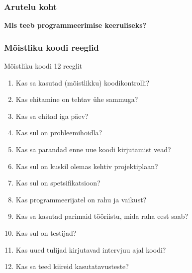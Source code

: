\begin{frame}[fragile]
  \frametitle{Arutelu koht}
		\begin{center}
			\textbf{Mis teeb programmeerimise keeruliseks?}
		\end{center}
\end{frame}


\begin{frame}[fragile]
  \frametitle{Mõistliku koodi reeglid}
  Mõistliku koodi 12 reeglit \cite{spolsky2004joel}
\small  
	\begin{enumerate}
		\item Kas sa kasutad (mõistlikku) koodikontrolli?
		\item Kas ehitamine on tehtav ühe sammuga?
		\item Kas sa ehitad iga päev?
		\item Kas sul on probleemihoidla?
		\item Kas sa parandad enne uue koodi kirjutamist vead?
		\item Kas sul on kuskil olemas kehtiv projektiplaan?
		\item Kas sul on spetsifikatsioon?
		\item Kas programmeerijatel on rahu ja vaikust?
		\item Kas sa kasutad parimaid tööriistu, mida raha eest saab?
		\item Kas sul on testijad?
		\item Kas uued tulijad kirjutavad intervjuu ajal koodi?
		\item Kas sa teed kiireid kasutatavusteste?
	\end{enumerate}
\normalsize
\end{frame}


